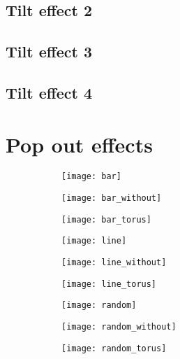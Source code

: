 \subsection{Tilt effect 2}
\subsection{Tilt effect 3}
\subsection{Tilt effect 4}

\section{Pop out effects}


\begin{figure}[H]
\caption{}
\begin{subfigure}{.33\textwidth}
  \centering
  \texttt{[image: bar]}
\end{subfigure}%
\hfill
\begin{subfigure}{.33\textwidth}
  \centering
  \texttt{[image: bar\_without]}
\end{subfigure}
\hfill
\begin{subfigure}{.33\textwidth}
  \centering
  \texttt{[image: bar\_torus]}
\end{subfigure}%
\hfill
\begin{subfigure}{.33\textwidth}
  \centering
  \texttt{[image: line]}
\end{subfigure}
\hfill
\begin{subfigure}{.33\textwidth}
  \centering
  \texttt{[image: line\_without]}
\end{subfigure}%
\hfill
\begin{subfigure}{.33\textwidth}
  \centering
  \texttt{[image: line\_torus]}
\end{subfigure}
\hfill
\begin{subfigure}{.33\textwidth}
  \centering
  \texttt{[image: random]}
\end{subfigure}%
\hfill
\begin{subfigure}{.33\textwidth}
  \centering
  \texttt{[image: random\_without]}
\end{subfigure}%
\hfill
\begin{subfigure}{.33\textwidth}
  \centering
  \texttt{[image: random\_torus]}
\end{subfigure}
\end{figure}

